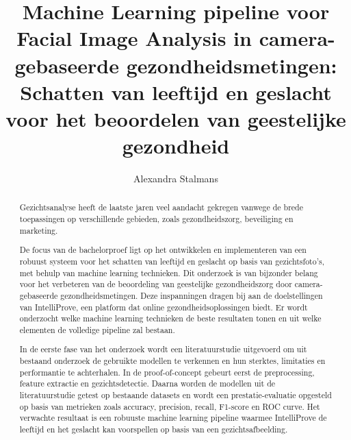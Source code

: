 \documentclass{hogent-article}
\title{Machine Learning pipeline voor Facial Image Analysis in camera-gebaseerde gezondheidsmetingen: Schatten van leeftijd en geslacht voor het beoordelen van geestelijke gezondheid}
\author{Alexandra Stalmans}
\begin{document}
\begin{abstract}
Gezichtsanalyse heeft de laatste jaren veel aandacht gekregen vanwege de brede toepassingen op verschillende gebieden, zoals gezondheidszorg, beveiliging en marketing.

De focus van de bachelorproef ligt op het ontwikkelen en implementeren van een robuust systeem voor het schatten van leeftijd en geslacht op basis van gezichtsfoto's, met behulp van machine learning technieken. Dit onderzoek is van bijzonder belang voor het verbeteren van de beoordeling van geestelijke gezondheidszorg door camera-gebaseerde gezondheidsmetingen. Deze inspanningen dragen bij aan de doelstellingen van IntelliProve, een platform dat online gezondheidsoplossingen biedt.  Er wordt onderzocht welke machine learning technieken de beste resultaten tonen en uit welke elementen de volledige pipeline zal bestaan.  

In de eerste fase van het onderzoek wordt een literatuurstudie uitgevoerd om uit bestaand onderzoek de gebruikte modellen te verkennen en hun sterktes, limitaties en performantie te achterhalen. In de proof-of-concept gebeurt eerst de preprocessing, feature extractie en gezichtsdetectie. Daarna worden de modellen uit de literatuurstudie getest op bestaande datasets en wordt een prestatie-evaluatie opgesteld op basis van metrieken zoals accuracy, precision, recall, F1-score en ROC curve. Het verwachte resultaat is een robuuste machine learning pipeline waarmee IntelliProve de leeftijd en het geslacht kan voorspellen op basis van een gezichtsafbeelding.
\end{abstract}

\tableofcontents


\printbibliography[heading=bibintoc]
\end{document}

